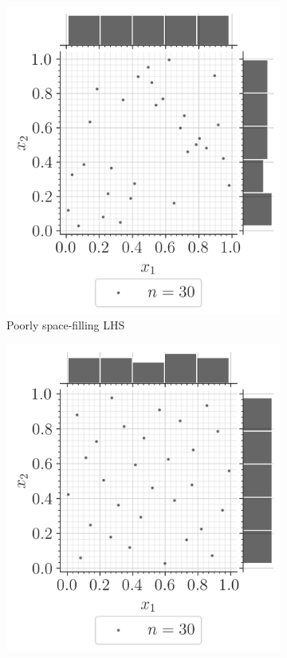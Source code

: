 \begin{figure}[ht]
    \centering
    \begin{subfigure}[b]{0.32\textwidth}
        \centering
        \includegraphics[width=\textwidth]{../numerical_experiments/chapter1/figures/poor_LHS.png}
        \caption{Poorly space-filling LHS}
        \label{fig:poor_LHS}
    \end{subfigure}
    \hfill
    \begin{subfigure}[b]{0.32\textwidth}
        \centering
        \includegraphics[width=\textwidth]{../numerical_experiments/chapter1/figures/optimized_C2_LHS.png}

\end{subfigure}
\end{figure}
